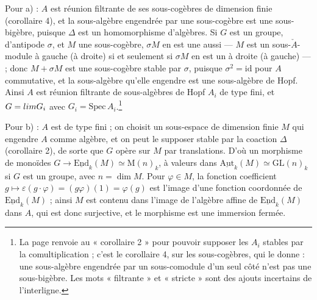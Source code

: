 \documentclass[11pt,a4paper]{article}
\begin{document}
Pour a) : $A$ est réunion filtrante de ses sous-cogèbres de dimension finie
(corollaire 4), et la sous-algèbre engendrée par une sous-cogèbre est une
sous-bigèbre, puisque $\Delta$ est un homomorphisme d'algèbres. Si $G$ est un
groupe, d'antipode $\sigma$, et $M$ une sous-cogèbre, $\sigma M$ en est une
aussi --- $M$ est un sous-$\check{A}$-module à gauche (à droite) si et
seulement si $\sigma M$ en est un à droite (à gauche) --- ; donc
$M + \sigma M$ est une sous-cogèbre stable par $\sigma$, puisque
$\sigma^{2} = \mathrm{id}$ pour $A$ commutative, et la sous-algèbre qu'elle
engendre est une sous-algèbre de Hopf. Ainsi $A$ est réunion filtrante de
sous-algèbres de Hopf $A_{i}$ de type fini, et $G = \varprojlim G_{i}$ avec
$G_{i} = \mathrm{Spec}\, A_{i}$.\footnote{La page renvoie au « corollaire 2 »
pour pouvoir supposer les $A_{i}$ stables par la comultiplication ; c'est le
corollaire 4, sur les sous-cogèbres, qui le donne : une sous-algèbre engendrée
par un sous-comodule d'un seul côté n'est pas une sous-bigèbre. Les mots
« filtrante » et « stricte » sont des ajouts incertains de l'interligne.}

Pour b) : $A$ est de type fini ; on choisit un sous-espace de dimension
finie $M$ qui engendre $A$ comme algèbre, et on peut le supposer stable par
la coaction $\Delta$ (corollaire 2), de sorte que $G$ opère sur $M$ par
translations. D'où un morphisme de monoïdes
$G \to \underline{\mathrm{End}}_{k}(M) \simeq \mathrm{M}(n)_{k}$, à valeurs
dans $\underline{\mathrm{Aut}}_{k}(M) \simeq \mathrm{GL}(n)_{k}$ si $G$ est un
groupe, avec $n = \dim M$. Pour $\varphi \in M$, la fonction coefficient
$g \mapsto \varepsilon(g \cdot \varphi) = (g \varphi)(1) = \varphi(g)$ est
l'image d'une fonction coordonnée de $\underline{\mathrm{End}}_{k}(M)$ ; ainsi
$M$ est contenu dans l'image de l'algèbre affine de
$\underline{\mathrm{End}}_{k}(M)$ dans $A$, qui est donc surjective, et le
morphisme est une immersion fermée.
\end{document}

